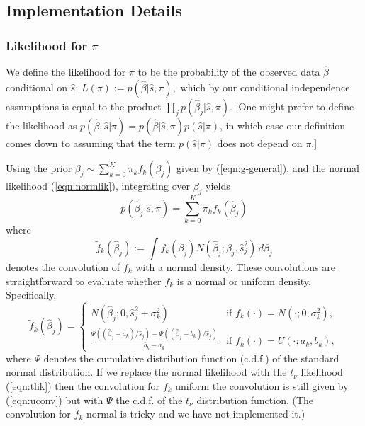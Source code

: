 \documentclass[11pt]{article}
\def\bhat{\hat{\beta}}
\def\shat{\hat{s}}
\begin{document}
\subsection*{Implementation Details}

\subsubsection*{Likelihood for $\pi$}

We define the likelihood for $\pi$ to be the probability of the observed data $\bhat$ conditional on $\shat$: $L(\pi) := p(\bhat | \shat,\pi),$ which
by our conditional independence assumptions is equal to the product $\prod_j p(\bhat_j | \shat, \pi)$. [One might prefer to define the likelihood as $p(\bhat, \shat | \pi) = p(\bhat | \shat, \pi) p(\shat | \pi)$, in which case our definition comes down to assuming that the term $p(\shat | \pi)$ does not depend on $\pi$.]

Using the prior $\beta_j \sim \sum_{k=0}^K \pi_k f_k(\beta_j)$ given by (\ref{eqn:g-general}), and the normal likelihood (\ref{eqn:normlik}), integrating over $\beta_j$ yields
\begin{equation}
p(\bhat_j | \shat,\pi)  = \sum_{k=0}^K \pi_k \tilde{f}_k(\bhat_j)
\end{equation}
where 
\begin{equation}
\tilde{f}_k(\bhat_j) := \int f_k(\beta_j) N(\bhat_j; \beta_j,\shat^2_j) \, d\beta_j
\end{equation}
denotes the convolution of $f_k$ with a normal density.
These convolutions are straightforward to evaluate whether $f_k$ is a normal or uniform density.
Specifically, 
\begin{equation} \label{eqn:uconv}
\tilde{f}_k(\bhat_j)  = 
\begin{cases}
N(\bhat_j;0, \shat_j^2 +  \sigma_k^2) & \text{if $f_k(\cdot) = N(\cdot; 0, \sigma_k^2)$}, \\
\frac{\Psi((\bhat_j-a_k)/\shat_j) - \Psi((\bhat_j-b_k)/\shat_j)}{b_k-a_k} & \text{if $f_k(\cdot) = U(\cdot; a_k,b_k)$},
\end{cases}
\end{equation}
where $\Psi$ denotes the cumulative distribution function (c.d.f.) of the standard normal distribution.
If we replace the normal likelihood with the $t_\nu$ likelihood (\ref{eqn:tlik}) then the convolution 
for $f_k$ uniform the convolution is still given by (\ref{eqn:uconv}) but with $\Psi$ the c.d.f. 
of the $t_\nu$ distribution function. (The convolution for $f_k$ normal is tricky and we have not implemented it.)
\end{document}
